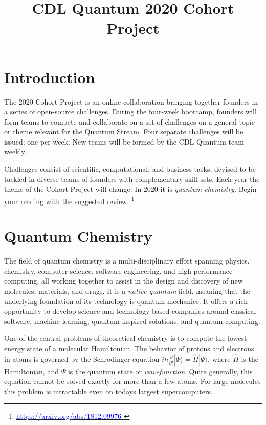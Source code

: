 \documentclass[12pt]{article}
\title{CDL Quantum 2020 Cohort Project}
\begin{document}
\maketitle

\thispagestyle{empty}
\section{Introduction}

The 2020 Cohort Project is an online collaboration bringing together founders in a series of open-source challenges.
During the four-week bootcamp, founders will form teams to compete and collaborate on a set of challenges on a general topic or theme
relevant for the Quantum Stream.  Four separate challenges will be issued; one per week.  New teams will be formed by the CDL Quantum team weekly.

Challenges consist of scientific, computational, and business tasks, devised to be tackled in diverse teams of founders with complementary skill sets.  Each year
the theme of the Cohort Project will change.  In 2020 it is {\it quantum chemistry}.  Begin your reading with the suggested review.
\footnote{\href{https://arxiv.org/abs/1812.09976}{\textcolor{blue}{https://arxiv.org/abs/1812.09976} }}


\section{Quantum Chemistry}

The field of quantum chemistry is a multi-disciplinary effort spanning physics, chemistry, computer science, software engineering, and high-performance computing,
all working together to assist in the design and discovery of new molecules, materials, and drugs.  It is a {\it native quantum} field, meaning that the underlying
foundation of its technology is quantum mechanics. It offers a rich opportunity to develop science and technology
based companies around classical software, machine learning, quantum-inspired solutions, and quantum computing.

One of the central problems of theoretical chemistry is to compute the lowest energy state of a molecular Hamiltonian.
The behavior of protons and electrons in atoms is governed by the Schrodinger equation
$i \hbar \frac{\partial }{ \partial t}  | \Psi \rangle = \hat{H} | \Psi \rangle$, where $\hat{H}$ is the Hamiltonian, and $\Psi$ is the quantum state or {\it wavefunction}.
Quite generally, this equation cannot be solved exactly for more than a few atoms.
For large molecules this problem is intractable even on todays largest supercomputers.
\end{document}
